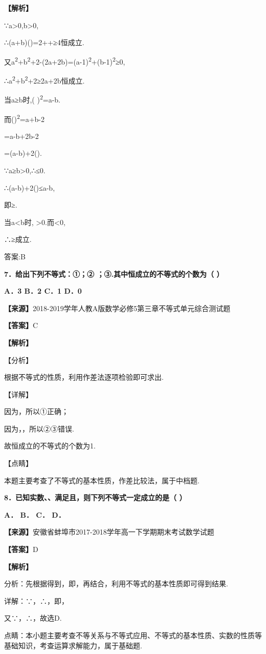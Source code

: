 \textbf{【解析】}

∵a\textgreater0,b\textgreater0,

∴(a+b)()=2++≥4恒成立.

又a\textsuperscript{2}+b\textsuperscript{2}+2-(2a+2b)=(a-1)\textsuperscript{2}+(b-1)\textsuperscript{2}≥0,

∴a\textsuperscript{2}+b\textsuperscript{2}+2≥2a+2b恒成立.

当a≥b时,( )\textsuperscript{2}=a-b.

而()\textsuperscript{2}=a+b-2

=a-b+2b-2

=(a-b)+2().

∵a≥b\textgreater0,∴≤0.

∴(a-b)+2()≤a-b,

即≥.

当a\textless b时, \textgreater0.而\textless0,

∴≥成立.

答案:B

\textbf{7．给出下列不等式：①；② ；③.其中恒成立的不等式的个数为（ ）}

\textbf{A．3 B．2 C．1 D．0}

\textbf{【来源】}2018-2019学年人教A版数学必修5第三章不等式单元综合测试题

\textbf{【答案】}C

\textbf{【解析】}

【分析】

根据不等式的性质，利用作差法逐项检验即可求出.

【详解】

因为，所以①正确；

因为，，所以②③错误.

故恒成立的不等式的个数为1.

【点睛】

本题主要考查了不等式的基本性质，作差比较法，属于中档题.

\textbf{8．已知实数、、满足且，则下列不等式一定成立的是（ ）}

\textbf{A． B． C． D．}

\textbf{【来源】}安徽省蚌埠市2017-2018学年高一下学期期末考试数学试题

\textbf{【答案】}D

\textbf{【解析】}

分析：先根据得到，即，再结合，利用不等式的基本性质即可得到结果.

详解：∵，∴，即，

又∵，∴，故选D.

点睛：本小题主要考查不等关系与不等式应用、不等式的基本性质、实数的性质等基础知识，考查运算求解能力，属于基础题.

